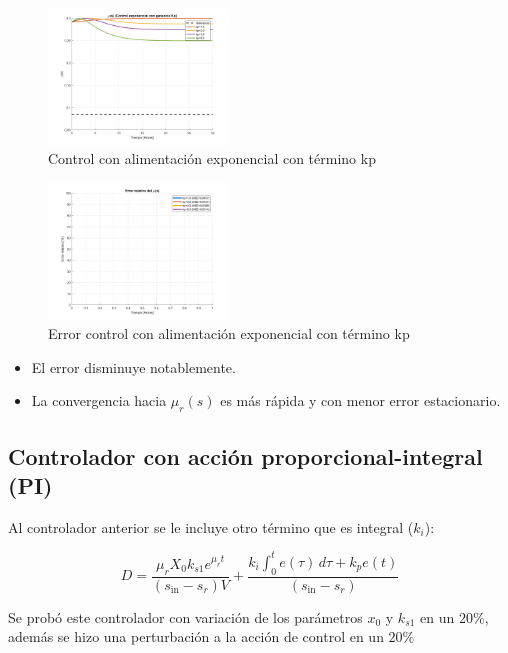 \documentclass[letterpaper, 10 pt, conference]{ieeeconf}  %
\begin{document}
\begin{figure}[H]
  \centering
  \includegraphics[width=0.43\textwidth]{./Images_tp3/exp_kp.png}
  \caption{Control con alimentación exponencial con término kp}
\end{figure}
\begin{figure}[H]
  \centering
  \includegraphics[width=0.43\textwidth]{./Images_tp3/exp_err_kp.png}
  \caption{Error control con alimentación exponencial con término kp}
\end{figure}

\begin{itemize}  
    \item El error disminuye notablemente.  
    \item La convergencia hacia \(\mu_r(s)\) es más rápida y con menor error estacionario.  
\end{itemize}  

\subsection{Controlador con acción proporcional-integral (PI)}  
Al controlador anterior se le incluye otro término que es integral (\(k_i\)):

\begin{equation}
D = \frac{\mu_r X_0 k_{s1} e^{\mu_r t}}{(s_{\text{in}} - s_r) V} + \frac{k_i \int_{0}^{t} e(\tau) \, d\tau + k_p e(t)}{(s_{\text{in}} - s_r)}
\end{equation}

Se probó este controlador con variación de los parámetros $x_0$ y $k_{s1}$ en un $20\%$, además se hizo una perturbación a la acción de control en un $20\%$
\end{document}
